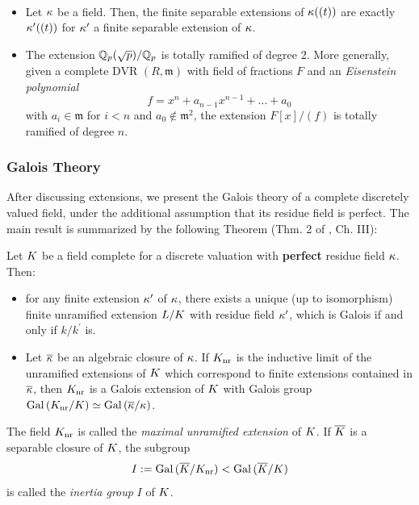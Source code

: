 \documentclass[a4paper, oneside]{memoir}
\begin{document}
\begin{example}\
    \begin{itemize}
        \item Let $\kappa$ be a field. Then, the finite separable extensions of $\kappa((t))$ are exactly $\kappa^{\prime}((t))$ for $\kappa^{\prime} $ a finite separable extension of $\kappa$.
        \item The extension $\mathbb{Q}_p(\sqrt{p})/\mathbb{Q}_p$ is totally ramified of degree 2. More generally, given a complete DVR $(R,\mathfrak{m})$ with field of fractions $F$ and an \textit{Eisenstein polynomial}
              \[
                  f=x^n+a_{n-1}x^{n-1}+\ldots+a_0
              \]
              with $a_i\in\mathfrak{m}$ for $i<n$ and $a_0\not\in\mathfrak{m}^2$, the extension $F[x]/(f)$ is totally ramified of degree $n$.
    \end{itemize}
\end{example}
\subsubsection{Galois Theory}
After discussing extensions, we present the Galois theory of a complete discretely valued field, under the additional assumption that its residue field is perfect. The main result is summarized by the following Theorem (Thm. 2 of \cite{SerreCL}, Ch. III):

\begin{theorem}Let $K$ be a field complete for a discrete valuation with \textbf{perfect} residue field $\kappa$. Then:
    \begin{itemize}
        \item for any finite extension $\kappa^{\prime} $ of \(\kappa\), there exists a unique (up to isomorphism) finite unramified extension $L / K$ with residue field $\kappa^{\prime} $, which is Galois if and only if $k/k^{\prime}$ is.
        \item Let \(\overline{\kappa}\) be an algebraic closure of \(\kappa\). If $K_{\text{nr}}$ is the inductive limit of the unramified extensions of $K$ which correspond to finite extensions
              contained in $\overline{\kappa}$, then $K_{\text{nr}}$ is a Galois extension of $K$ with Galois group $\operatorname{Gal}{(K_{\text{nr}}/K)}\simeq \operatorname{Gal}{(\overline{\kappa}/\kappa)}$.
    \end{itemize}
\end{theorem}

The field $K_{\text{nr}}$ is called the \textit{maximal unramified extension} of $K$. If $\overline{K}$ is a separable closure of $K$, the subgroup
\[
    I:=\operatorname{Gal}{(\overline{K}/K_{\text{nr}})} < \operatorname{Gal}{(\overline{K}/K)}
\]
is called the \textit{inertia group} $I$ of $K$.
\end{document}
